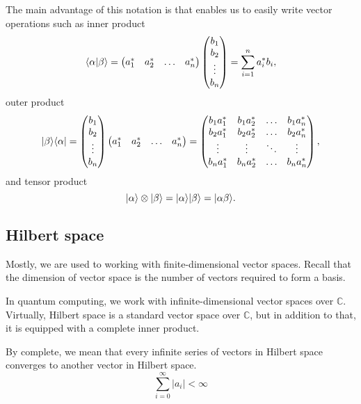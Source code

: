 The main advantage of this notation is that enables us to easily write vector operations such as inner product
$$\langle\alpha\vert\beta\rangle = \begin{pmatrix}
    a_1^* & a_2^* & \hdots & a_n^*
\end{pmatrix}\begin{pmatrix}
    b_1 \\
    b_2 \\
    \vdots \\
    b_n
\end{pmatrix} = \sum_{i=1}^{n} a_i^{*} b_i,$$ outer product
$$\lvert\beta\rangle\langle\alpha\rvert = \begin{pmatrix}
    b_1 \\
    b_2 \\
    \vdots \\
    b_n
\end{pmatrix}
\begin{pmatrix}
    a_1^* & a_2^* & \hdots & a_n^*
\end{pmatrix} = \begin{pmatrix}
    b_{1}a_1^* & b_{1}a_2^* & \hdots & b_{1}a_n^* \\
    b_{2}a_1^* & b_{2}a_2^* & \hdots & b_{2}a_n^* \\
    \vdots & \vdots & \ddots & \vdots \\
    b_{n}a_1^* & b_{n}a_2^* & \hdots & b_{n}a_n^*
\end{pmatrix},$$ and tensor product
$$\lvert\alpha\rangle \otimes \lvert\beta\rangle = \lvert\alpha\rangle\lvert\beta\rangle = \lvert\alpha \beta\rangle\text{.}$$


\subsection{Hilbert space}
Mostly, we are used to working with finite-dimensional vector spaces. Recall that the dimension of vector space is the number of vectors required to form a basis.

In quantum computing, we work with infinite-dimensional vector spaces over $\mathbb{C}$. Virtually, Hilbert space is a standard vector space over $\mathbb{C}$, but in addition to that, it is equipped with a complete inner product.

By complete, we mean that every infinite series of vectors in Hilbert space converges to another vector in Hilbert space. $$\sum_{i=0}^{\infty}\vert a_i \vert < \infty$$
\\


